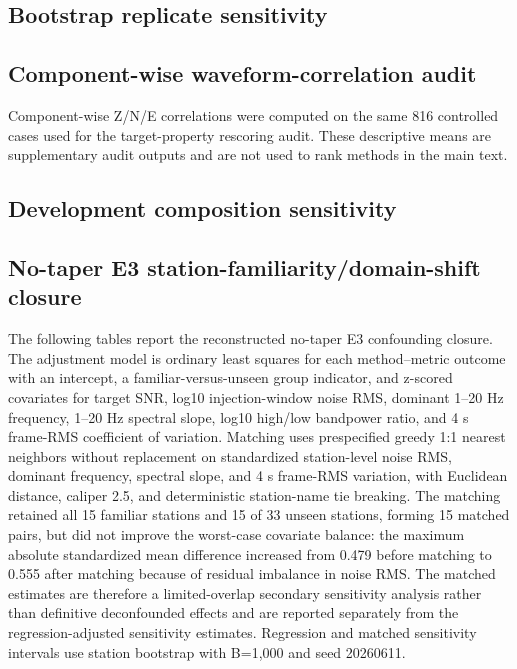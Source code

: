 \documentclass[12pt]{article}
\begin{document}
\scriptsize
\resizebox{\linewidth}{!}{}
\normalsize

\subsection*{Bootstrap replicate sensitivity}
\resizebox{\linewidth}{!}{}

\subsection*{Component-wise waveform-correlation audit}
Component-wise Z/N/E correlations were computed on the same 816 controlled cases used for the target-property rescoring audit. These descriptive means are supplementary audit outputs and are not used to rank methods in the main text.

\resizebox{\linewidth}{!}{}

\subsection*{Development composition sensitivity}
\resizebox{\linewidth}{!}{}

\subsection*{No-taper E3 station-familiarity/domain-shift closure}
The following tables report the reconstructed no-taper E3 confounding closure. The adjustment model is ordinary least squares for each method--metric outcome with an intercept, a familiar-versus-unseen group indicator, and z-scored covariates for target SNR, log10 injection-window noise RMS, dominant 1--20 Hz frequency, 1--20 Hz spectral slope, log10 high/low bandpower ratio, and 4 s frame-RMS coefficient of variation. Matching uses prespecified greedy 1:1 nearest neighbors without replacement on standardized station-level noise RMS, dominant frequency, spectral slope, and 4 s frame-RMS variation, with Euclidean distance, caliper 2.5, and deterministic station-name tie breaking. The matching retained all 15 familiar stations and 15 of 33 unseen stations, forming 15 matched pairs, but did not improve the worst-case covariate balance: the maximum absolute standardized mean difference increased from 0.479 before matching to 0.555 after matching because of residual imbalance in noise RMS. The matched estimates are therefore a limited-overlap secondary sensitivity analysis rather than definitive deconfounded effects and are reported separately from the regression-adjusted sensitivity estimates. Regression and matched sensitivity intervals use station bootstrap with B=1,000 and seed 20260611.
\end{document}
